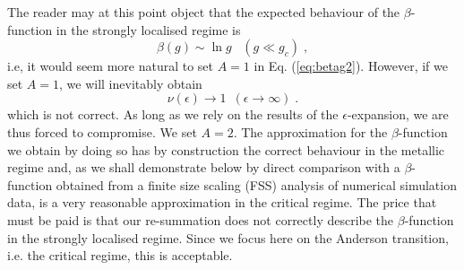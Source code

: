 \documentclass[singlecolumn]{jpsj3}
\begin{document}
The reader may at this point object that the expected behaviour of the $\beta$-function
in the strongly localised regime is
\begin{equation}
	\beta(g) \sim \ln g \;\;\; (g \ll g_c) \;,
\end{equation}
i.e, it would seem more natural to set $A=1$ in Eq. (\ref{eq:betag2}).
However,
if we set $A=1$, we will inevitably obtain
\begin{equation}\label{eq:exponent_asymptotic_a=1}
  \nu \left( \epsilon \right) \rightarrow 1 \,\,\, (\epsilon \rightarrow \infty) \;.
\end{equation}
which is not correct. As long as we rely on the results of the $\epsilon$-expansion, we are thus forced to compromise.
We set $A=2$.
The approximation for the $\beta$-function we obtain by doing so has by construction the
correct behaviour in the metallic regime and, as we shall demonstrate below by direct comparison with a $\beta$-function obtained from a finite size scaling (FSS) analysis of numerical simulation data, is a very reasonable approximation in the critical regime.
The price that must be paid is that our re-summation does not correctly describe the $\beta$-function in the strongly localised regime.
Since we focus here on the Anderson transition, i.e. the critical regime, this
is acceptable.
\end{document}
